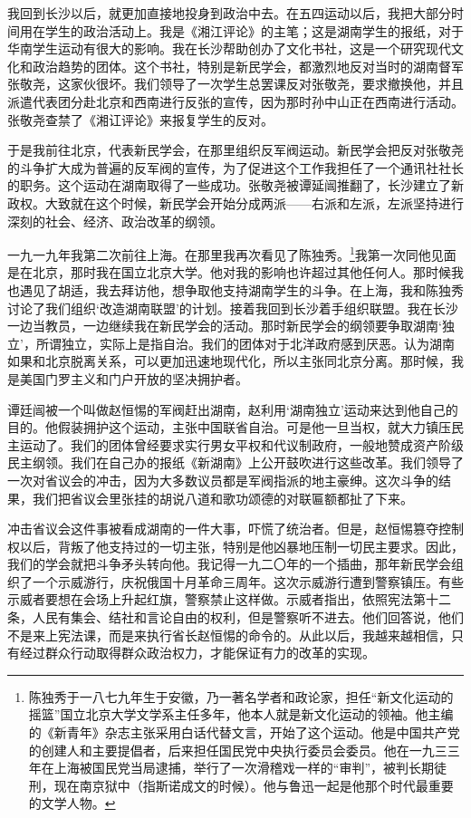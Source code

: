 \documentclass[10pt]{book}
\begin{document}
我回到长沙以后，就更加直接地投身到政治中去。在五四运动以后，我把大部分时间用在学生的政治活动上。我是《湘江评论》的主笔；这是湖南学生的报纸，对于华南学生运动有很大的影响。我在长沙帮助创办了文化书社，这是一个研究现代文化和政治趋势的团体。这个书社，特别是新民学会，都激烈地反对当时的湖南督军张敬尧，这家伙很坏。我们领导了一次学生总罢课反对张敬尧，要求撤换他，并且派遣代表团分赴北京和西南进行反张的宣传，因为那时孙中山正在西南进行活动。张敬尧查禁了《湘讧评论》来报复学生的反对。

于是我前往北京，代表新民学会，在那里组织反军阀运动。新民学会把反对张敬尧的斗争扩大成为普遍的反军阀的宣传，为了促进这个工作我担任了一个通讯社社长的职务。这个运动在湖南取得了一些成功。张敬尧被谭延闿推翻了，长沙建立了新政权。大致就在这个时候，新民学会开始分成两派——右派和左派，左派坚持进行深刻的社会、经济、政治改革的纲领。

一九一九年我第二次前往上海。在那里我再次看见了陈独秀。\footnote{陈独秀于一八七九年生于安徽，乃一著名学者和政论家，担任“新文化运动的摇篮”国立北京大学文学系主任多年，他本人就是新文化运动的领袖。他主编的《新青年》杂志主张采用白话代替文言，开始了这个运动。他是中国共产党的创建人和主要提倡者，后来担任国民党中央执行委员会委员。他在一九三三年在上海被国民党当局逮捕，举行了一次滑稽戏一样的“审判”，被判长期徒刑，现在南京狱中（指斯诺成文的时候）。他与鲁迅一起是他那个时代最重要的文学人物。}我第一次同他见面是在北京，那时我在国立北京大学。他对我的影响也许超过其他任何人。那时候我也遇见了胡适，我去拜访他，想争取他支持湖南学生的斗争。在上海，我和陈独秀讨论了我们组织‘改造湖南联盟’的计划。接着我回到长沙着手组织联盟。我在长沙一边当教员，一边继续我在新民学会的活动。那时新民学会的纲领要争取湖南‘独立’，所谓独立，实际上是指自治。我们的团体对于北洋政府感到厌恶。认为湖南如果和北京脱离关系，可以更加迅速地现代化，所以主张同北京分离。那时候，我是美国门罗主义和门户开放的坚决拥护者。

谭廷闿被一个叫做赵恒惕的军阀赶出湖南，赵利用‘湖南独立’运动来达到他自己的目的。他假装拥护这个运动，主张中国联省自治。可是他一旦当权，就大力镇压民主运动了。我们的团体曾经要求实行男女平权和代议制政府，一般地赞成资产阶级民主纲领。我们在自己办的报纸《新湖南》上公开鼓吹进行这些改革。我们领导了一次对省议会的冲击，因为大多数议员都是军阀指派的地主豪绅。这次斗争的结果，我们把省议会里张挂的胡说八道和歌功颂德的对联匾额都扯了下来。

冲击省议会这件事被看成湖南的一件大事，吓慌了统治者。但是，赵恒惕篡夺控制权以后，背叛了他支持过的一切主张，特别是他凶暴地压制一切民主要求。因此，我们的学会就把斗争矛头转向他。我记得一九二〇年的一个插曲，那年新民学会组织了一个示威游行，庆祝俄国十月革命三周年。这次示威游行遭到警察镇压。有些示威者要想在会场上升起红旗，警察禁止这样做。示威者指出，依照宪法第十二条，人民有集会、结社和言论自由的权利，但是警察听不进去。他们回答说，他们不是来上宪法课，而是来执行省长赵恒惕的命令的。从此以后，我越来越相信，只有经过群众行动取得群众政治权力，才能保证有力的改革的实现。
\end{document}
